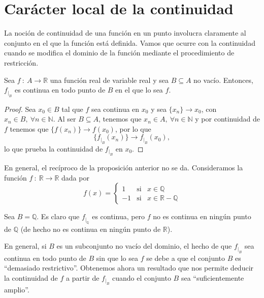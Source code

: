 \section{Carácter local de la continuidad}
La noción de continuidad de una función en un punto involucra claramente al conjunto en el que la función está definida. Vamos que ocurre con la continuidad cuando se modifica el dominio de la función
mediante el procedimiento de restricción.

\begin{prop}\label{prop:12.3.1}
    Sea $f ~:~ A \longrightarrow \mathbb{R}$ una función real de variable real y sea $B \subseteq A$ no vacío. Entonces, $f_{|_B}$ es continua en todo punto de $B$ en el que lo sea $f$.
\end{prop}
\begin{proof}
    Sea $x_0 \in B$ tal que $f$ sea continua en $x_0$ y sea $\{x_n\} \longrightarrow x_0$, con $x_n \in B, ~ \forall n \in \mathbb{N}$.
    Al ser $B \subseteq A$, tenemos que $x_n \in A, ~ \forall n \in \mathbb{N}$ y por continuidad de $f$ tenemos que
    $\{f(x_n)\} \longrightarrow f(x_0)$, por lo que
    \begin{equation*}
        \{f_{|_B}(x_n)\} \longrightarrow f_{|_B}(x_0),
    \end{equation*}
    lo que prueba la continuidad de $f_{|_B}$ en $x_0$. 
\end{proof}

En general, el recíproco de la proposición anterior no se da. Consideramos la función
$f ~:~ \mathbb{R} \longrightarrow \mathbb{R}$ dada por
\begin{equation*}
    f(x) =
    \left\{ \begin{array}{lll}
        1 & \text{si} & x \in \mathbb{Q} \\
        -1 & \text{si} & x \in \mathbb{R} - \mathbb{Q}
    \end{array}
    \right.
\end{equation*}

Sea $B = \mathbb{Q}$. Es claro que $f_{|_{\mathbb{Q}}}$ es continua, pero $f$ no es continua en ningún punto de $\mathbb{Q}$
(de hecho no es continua en ningún punto de $\mathbb{R}$).

En general, si $B$ es un subconjunto no vacío del dominio, el hecho de que $f_{|_B}$ sea continua en todo punto de $B$ sin que lo sea $f$ se debe a que el conjunto $B$ es ``demasiado restrictivo''. Obtenemos ahora un resultado que nos permite deducir la continuidad de $f$ a partir de $f_{|_B}$ cuando el conjunto $B$ sea ``suficientemente amplio''.

